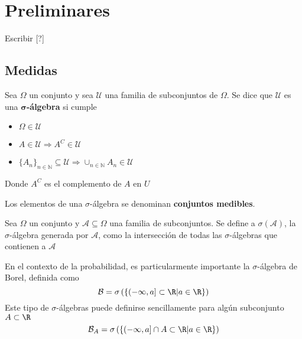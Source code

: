 
\chapter{Preliminares}

Escribir [?]


\section{Medidas}

\begin{definicion}%
Sea $\Omega$ un conjunto y sea $\mathcal{U}$ una familia de subconjuntos de $\Omega$. Se dice que 
$\mathcal{U}$ es una \textbf{$\boldsymbol{\sigma}$-álgebra} si cumple
\begin{itemize}
\item $\Omega \in \mathcal{U}$
\item $A \in \mathcal{U} \Rightarrow A^{C} \in \mathcal{U}$
\item 
$ \displaystyle \{ A_n \}_{n\in \mathbb{N}} \subseteq \mathcal{U} 
\Rightarrow \cup_{n\in \mathbb{N}} A_n \in \mathcal{U}$
\end{itemize}
Donde $A^{C}$ es el complemento de $A$ en $U$
\end{definicion}

Los elementos de una $\sigma$-álgebra se denominan \textbf{conjuntos medibles}. 

\begin{definicion}
Sea $\Omega$ un conjunto y $\mathcal{A} \subseteq \Omega$ una familia de subconjuntos. Se define a $\sigma(\mathcal{A})$, la $\sigma$-álgebra generada por $\mathcal{A}$, como la intersección de todas las $\sigma$-álgebras que contienen a $\mathcal{A}$  
\end{definicion}

En el contexto de la probabilidad, es particularmente importante la $\sigma$-álgebra de Borel, definida como
\begin{equation}
\mathcal{B} = \sigma\left( \left\{ \left( -\infty , a \right] \subset \R \lvert a\in \R \right\} \right)
\end{equation}
Este tipo de $\sigma$-álgebras puede definirse sencillamente para algún subconjunto $A \subset \R$
\begin{equation}
\mathcal{B}_A = \sigma\left( \left\{ \left( -\infty , a \right] \cap A \subset \R \lvert a\in \R \right\} \right)
\end{equation}

